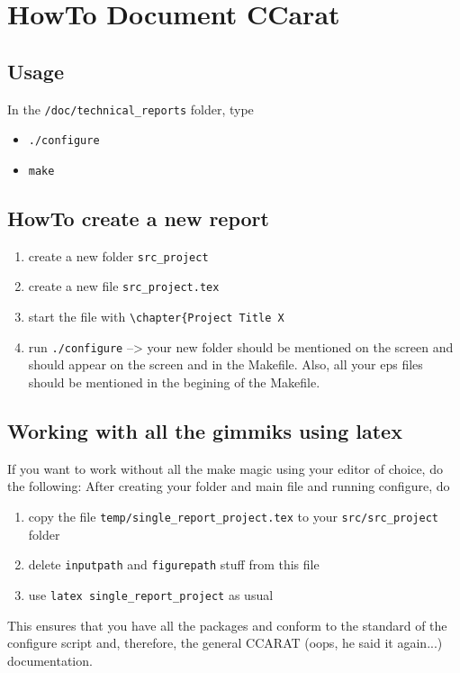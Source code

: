 \chapter{HowTo Document CCarat} 

\newcommand{\test}[1]{\vec{#1}}

\section{Usage}

In the \verb|/doc/technical_reports| folder, type
\begin{itemize}
\item \verb|./configure|
\item \verb|make|
\end{itemize}


\section{HowTo create a new report}

\begin{enumerate}
  \item create a new folder \verb|src_project|
  \item create a new file \verb|src_project.tex|
  \item start the file with \verb|\chapter{Project Title X|
  \item run \verb|./configure| --> your new folder should be mentioned on the screen and should appear on the screen and in the Makefile. Also, all your eps files should be mentioned in the begining of the Makefile.
\end{enumerate}


\section{Working with all the gimmiks using latex}
If you want to work without all the make magic using your editor of choice, do the following:
After creating your folder and main file and running configure, do
\begin{enumerate}
 \item copy the file \verb|temp/single_report_project.tex| to your \verb|src/src_project| folder
 \item delete \verb|inputpath| and \verb|figurepath| stuff from this file
 \item use \verb|latex single_report_project| as usual
\end{enumerate}
This ensures that you have all the packages and conform to the standard of the configure script and, therefore, the general CCARAT (oops, he said it again...) documentation.


